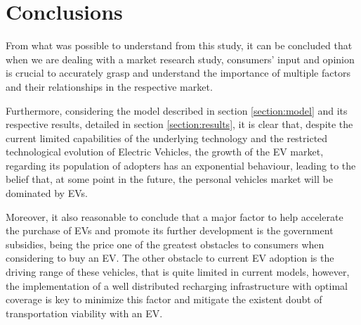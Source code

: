 \section{Conclusions}
From what was possible to understand from this study, it can be concluded that when we are dealing with a market research study, consumers' input and opinion is crucial to accurately grasp and understand the importance of multiple factors and their relationships in the respective market.

Furthermore, considering the model described in section \ref{section:model} and its respective results, detailed in section \ref{section:results}, it is clear that, despite the current limited capabilities of the underlying technology and the restricted technological evolution of Electric Vehicles, the growth of the EV market, regarding its population of adopters has an exponential behaviour, leading to the belief that, at some point in the future, the personal vehicles market will be dominated by EVs.

Moreover, it also reasonable to conclude that a major factor to help accelerate the purchase of EVs and promote its further development is the government subsidies, being the price one of the greatest obstacles to consumers when considering to buy an EV. The other obstacle to current EV adoption is the driving range of these vehicles, that is quite limited in current models, however, the implementation of a well distributed recharging infrastructure with optimal coverage is key to minimize this factor and mitigate the existent doubt of transportation viability with an EV.

\clearpage